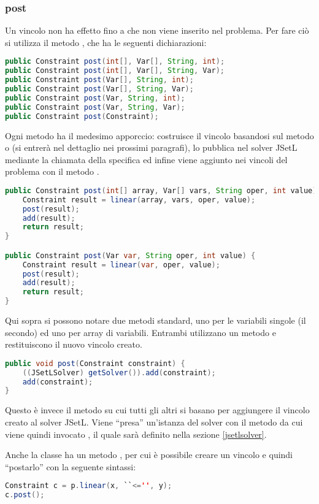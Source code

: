 \subsubsection{post}
Un vincolo non ha effetto fino a che non viene inserito nel problema. Per 
fare ciò si utilizza il metodo , che ha le seguenti dichiarazioni:
\begin{lstlisting}[language = Java, frame = single]
public Constraint post(int[], Var[], String, int);
public Constraint post(int[], Var[], String, Var);
public Constraint post(Var[], String, int);
public Constraint post(Var[], String, Var);
public Constraint post(Var, String, int);
public Constraint post(Var, String, Var);
public Constraint post(Constraint);
\end{lstlisting}
Ogni metodo  ha il medesimo apporccio: costruisce il vincolo 
basandosi sul metodo  o  (si entrerà
nel dettaglio nei prossimi paragrafi), lo pubblica nel solver JSetL mediante
la chiamata della specifica  ed infine
viene aggiunto nei vincoli del problema con il metodo .

\begin{lstlisting}[language = Java,
                   caption = {\files{post}.}]
public Constraint post(int[] array, Var[] vars, String oper, int value) {
	Constraint result = linear(array, vars, oper, value);
	post(result);
	add(result);
	return result;
}

public Constraint post(Var var, String oper, int value) {
	Constraint result = linear(var, oper, value);
	post(result);
	add(result);
	return result;
}
\end{lstlisting}
Qui sopra si possono notare due metodi  standard, uno per le 
variabili singole (il secondo) ed uno per array di variabili. Entrambi 
utilizzano un metodo  e restituiscono il nuovo vincolo
creato. 

\begin{lstlisting}[language = Java,
                   caption = {\files{post(Constraint)}.}]
public void post(Constraint constraint) {
	((JSetLSolver) getSolver()).add(constraint);
	add(constraint);
}
\end{lstlisting}
Questo è invece il metodo su cui tutti gli altri si basano per aggiungere
il vincolo creato al solver JSetL. Viene ``presa'' un'istanza del
solver con il metodo  da cui viene quindi invocato
, il quale sarà definito nella sezione \ref{jsetlsolver}.
\begin{flushleft}
Anche la classe  ha un metodo , per cui è 
possibile creare un vincolo e quindi ``postarlo'' con la seguente sintassi:
\begin{lstlisting}[language = Java, frame = single]
Constraint c = p.linear(x, ``<='', y);
c.post();
\end{lstlisting}
\end{flushleft}


